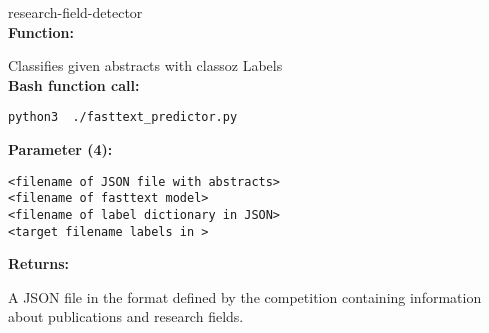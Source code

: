 research-field-detector\\
\textbf{Function: }

Classifies given abstracts with classoz Labels\\
\textbf{Bash function call: }
\begin{lstlisting}
python3  ./fasttext_predictor.py
\end{lstlisting}
\textbf{Parameter (4): }
\begin{lstlisting}
<filename of JSON file with abstracts>
<filename of fasttext model>
<filename of label dictionary in JSON>
<target filename labels in >
\end{lstlisting}
\textbf{Returns: }

A JSON file in the format defined by the competition containing information about publications and research fields.

\begin{comment}
#### 1. The classifier of FastText library (word embedding),
For training the fastText algorithm, the following code should be run:
```sh
python train_fastext_model.py
```
 In this code, for training the classifier, negative sampling 25 , epoch 150 , and ngram 2 are used as parameters. Also for applying the trained model on some test samples, the following script should be used:
 ```sh
python fasttext_predictor.py data_filename model_filename  label_dict  target
```
#### 2. Random forest algorithm from skilearn library
For training a random forest model, the following command can be used:
 ```sh
python train_sklearn_model.py
```
For training the classifier,  n_estimators=500, and random_state=42 are used as prameters. For applying the trained model on tes# Research Field Detector
t data, the following code should be use:
 ```sh
python sklearn_predictor.py
```
\subsubsection{SSOAR -- Metadata Harvestor}
For this reason a code is implemented to harvest metadata information. Here you can see how to run the harvestor 

code:
```sh
python harvest_ssoar.py
```
\subsubsection*{Evaluation}
For the evaluation, the following file can be used:
```sh
 ./evalouation_part/Evaluation_sklearn.ipynb
```
\end{comment}
